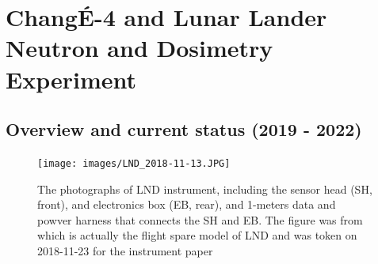 \section{Chang\'E-4 and Lunar Lander Neutron and Dosimetry Experiment}
\label{sec:change_4_LND}

\subsection{Overview and current status (2019 - 2022)}

\begin{figure}
    \centering
    \texttt{[image: images/LND\_2018-11-13.JPG]}
    \caption[Photograph of Lunar Lander neutron dosimetry experiment]{The photographs of LND instrument, including the sensor head (SH, front), and electronics box (EB, rear), and 1-meters data and powver harness that connects the SH and EB. The figure was from \citet{Wimmer-2020-LND} which is actually the flight spare model of LND and was token on 2018-11-23 for the instrument paper}
    \label{Fig:LND_instrument}
\end{figure}

